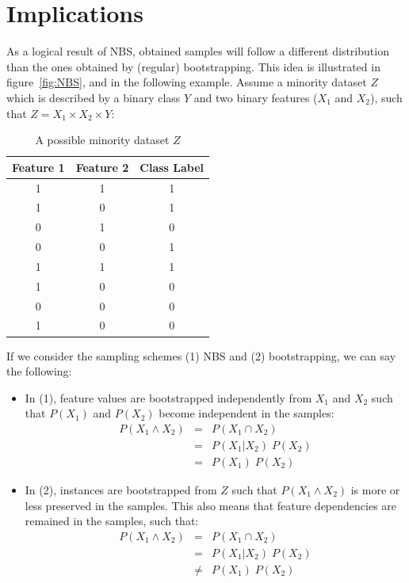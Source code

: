 \section{Implications}\label{rnb-implication}
As a logical result of NBS, obtained samples will follow a different distribution than the ones obtained by (regular) bootstrapping. This idea is illustrated in figure~\ref{fig:NBS}, and in the following example. Assume a minority dataset $Z$ which is described by a binary class $Y$ and two binary features ($X_1$ and $X_2$), such that $Z = X_1 \times X_2 \times Y$:

\begin{table}[h]
\centering  
\begin{tabular}{ c c c}    
Feature 1 & Feature 2 & Class Label\\
\hline
1& 1& 1\\
1& 0& 1\\
0& 1& 0\\
0& 0& 1\\
1& 1& 1\\
1& 0& 0\\
0& 0& 0\\
1& 0& 0\\
\end{tabular}
\label{tab:exampleZ}
\caption{A possible minority dataset $Z$} %
\end{table}

If we consider the sampling schemes (1) NBS and (2) bootstrapping, we can say the following:

\begin{itemize}
\item In (1), feature values are bootstrapped independently from $X_1$ and $X_2$ such that $P(X_1)$ and $P(X_2)$ become independent in the samples:
\begin{eqnarray}
P(X_1 \wedge X_2) &=& P(X_1 \cap X_2) \nonumber \\
&=& P(X_1|X_2)\;P(X_2) \nonumber \\
&=& P(X_1)\;P(X_2) \label{eq:px1px2indep}
\end{eqnarray}
\item In (2), instances are bootstrapped from $Z$ such that $P(X_1 \wedge X_2)$ is more or less preserved in the samples. This also means that feature dependencies are remained in the samples, such that:
\begin{eqnarray}
P(X_1 \wedge X_2) &=& P(X_1 \cap X_2) \nonumber \\
&=& P(X_1|X_2)\;P(X_2) \label{eq:px1px2dep} \\
&\neq& P(X_1)\;P(X_2) \nonumber
\end{eqnarray}
\end{itemize}

